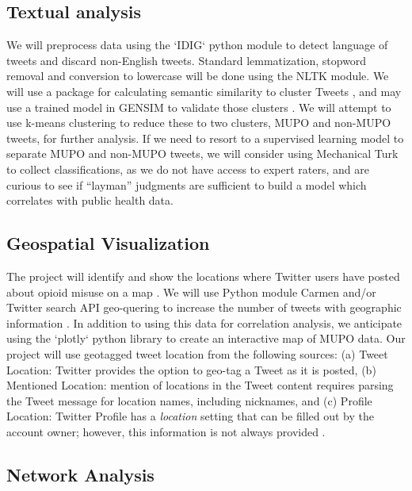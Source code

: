 \documentclass[sigconf]{acmart}
\begin{document}
\subsection{Textual analysis} 
We will preprocess data using the `IDIG` python module to detect language of 
tweets and discard non-English tweets. Standard lemmatization, stopword removal 
and conversion to lowercase will be done using the NLTK module. We will use 
a package for calculating semantic similarity to cluster Tweets \cite{chary17}, 
and may use a trained model in GENSIM to validate those clusters \cite{sarker17}. 
We will attempt to use k-means clustering to reduce these to two clusters, 
MUPO and non-MUPO tweets, for further analysis. If we need to resort to a 
supervised learning model to separate MUPO and non-MUPO tweets, we will 
consider using Mechanical Turk to collect classifications, as we do not have 
access to expert raters, and are curious to see if “layman” judgments are 
sufficient to build a model which correlates with public health data. 

\subsection{Geospatial Visualization}

The project will identify and show the locations where Twitter users have 
posted about opioid misuse on a map \cite{twittergeo}. We will use Python 
module Carmen and/or Twitter search API geo-quering to increase the number of 
tweets with geographic information \cite{dredze13}. In addition to using this 
data for correlation analysis, we anticipate using the `plotly` python library 
to create an interactive map of MUPO data. Our project will use geotagged tweet 
location from the following sources: (a) Tweet Location: Twitter provides the 
option to geo-tag a Tweet as it is posted, (b) Mentioned Location: mention of 
locations in the Tweet content requires parsing the Tweet message for location 
names, including nicknames, and (c) Profile Location: Twitter Profile has a 
\emph{location} setting that can be filled out by the account owner; however, 
this information is not always provided \cite{widener14}. 

\subsection{Network Analysis} 
\end{document}

